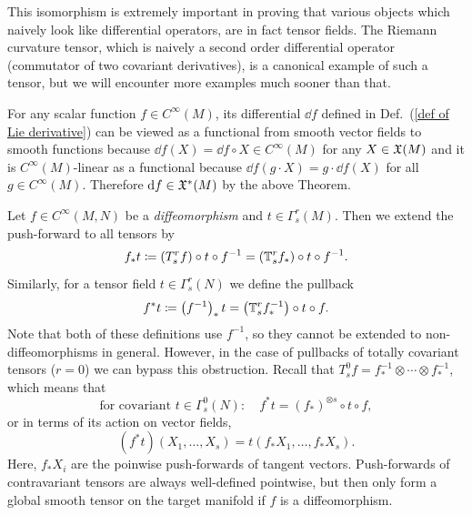 \begin{rem}
    This isomorphism is extremely important in proving that various objects which naively look like differential operators, are in fact tensor fields. The Riemann curvature tensor, which is naively a second order differential operator (commutator of two covariant derivatives), is a canonical example of such a tensor, but we will encounter more examples much sooner than that.
\end{rem}


\begin{example}\label{df is a one-form}
    For any scalar function $f\in C^\infty(M)$, its differential $\dd f$ defined in Def.\ (\ref{def of Lie derivative}) can be viewed as a functional from smooth vector fields to smooth functions because $\dd f(X)=\dd f\circ X\in C^\infty(M)$ for any $X\in\mathfrak{X}(M)$ and it is $C^\infty(M)$-linear as a functional because $\dd f(g\cdot X)=g\cdot \dd f(X)$ for all $g\in C^\infty(M)$. Therefore ${\mathrm{d}} f\in \mathfrak{X}^\ast(M)$ by the above Theorem.
\end{example}

\begin{defn}
    Let $f\in C^\infty(M,N)$ be a \emph{diffeomorphism} and $t\in \Gamma^r_s(M)$. Then we extend the push-forward to all tensors by
    \[
    f_\ast t\coloneqq (T^r_sf)\circ t\circ f^{-1}=(\mathbb{T}^r_s f_\ast)\circ t\circ f^{-1}.\label{eq pushforward formula}
    \]
    Similarly, for a tensor field $t\in \Gamma^r_s(N)$ we define the pullback
    \[
    f^\ast t\coloneqq \left(f^{-1}\right)_\ast t=\left(\mathbb{T}^r_s f^{-1}_\ast\right)\circ t\circ f.\label{eq pullback formula}
    \]
    Note that both of these definitions use $f^{-1}$, so they cannot be extended to non-diffeomorphisms in general. However, in the case of pullbacks of totally covariant tensors ($r=0$) we can bypass this obstruction. Recall that $T^0_s f=f_\ast^{-1}\otimes\cdots\otimes f_\ast^{-1}$, which means that
    \[
    \text{for covariant }t\in \Gamma^0_s(N):\quad f^\ast t= (f_\ast)^{\otimes s}\circ t\circ f,
    \]
    or in terms of its action on vector fields,
    \[
    (f^\ast t)(X_1,\ldots,X_s)=t(f_\ast X_1,\ldots,f_\ast X_s).
    \]
    Here, $f_\ast X_i$ are the poinwise push-forwards of tangent vectors. Push-forwards of contravariant tensors are always well-defined pointwise, but then only form a global smooth tensor on the target manifold if $f$ is a diffeomorphism.
\end{defn}

